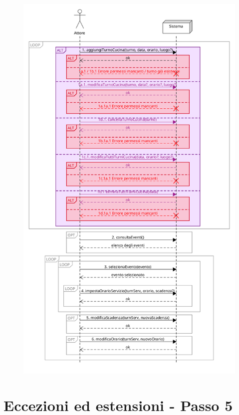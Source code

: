 \begin{figure}[h]
    \begin{center}
      \includegraphics[scale = 0.37]{images/SSD/SSD - Passo 1.png}
    \end{center}
  \end{figure}

  \pagebreak

\section{Eccezioni ed estensioni - Passo 5}

